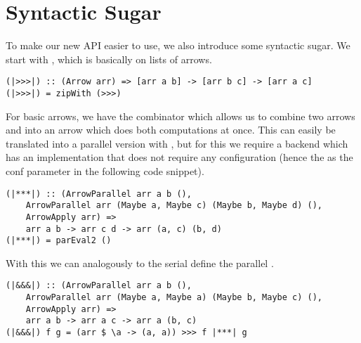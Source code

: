 \section{Syntactic Sugar}
To make our new API easier to use, we also introduce some syntactic sugar.
We start with \code{|>>>|}, which is basically \code{>>>} on lists of arrows.
\begin{lstlisting}[frame=htrbl]
(|>>>|) :: (Arrow arr) => [arr a b] -> [arr b c] -> [arr a c]
(|>>>|) = zipWith (>>>)
\end{lstlisting}
For basic arrows, we have the \code{***} combinator which allows us to combine two arrows  and  into an arrow  which does both computations at once. This can easily be translated into a parallel version with , but for this we require a backend which has an implementation that does not require any configuration (hence the \code{()} as the conf parameter in the following code snippet).
\begin{lstlisting}[frame=htrbl]
(|***|) :: (ArrowParallel arr a b (),
	ArrowParallel arr (Maybe a, Maybe c) (Maybe b, Maybe d) (),
	ArrowApply arr) =>
	arr a b -> arr c d -> arr (a, c) (b, d)
(|***|) = parEval2 ()
\end{lstlisting}
With this we can analogously to the serial \code{&&&} define the parallel \code{|&&&|}.
\begin{lstlisting}[frame=htrbl]
(|&&&|) :: (ArrowParallel arr a b (),
	ArrowParallel arr (Maybe a, Maybe a) (Maybe b, Maybe c) (),
	ArrowApply arr) =>
	arr a b -> arr a c -> arr a (b, c)
(|&&&|) f g = (arr $ \a -> (a, a)) >>> f |***| g
\end{lstlisting}